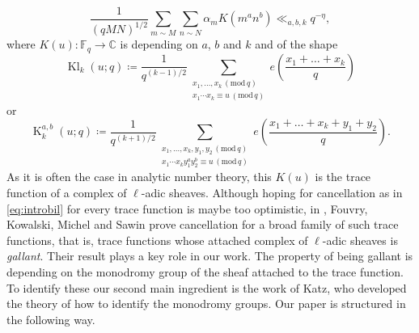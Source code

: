 \documentclass[12pt]{amsart}
\theoremstyle{plain}
\theoremstyle{definition}
\theoremstyle{remark}
\numberwithin{equation}{section}
\newcommand{\CC}{\mathbb{C}}
\newcommand{\FF}{\mathbb{F}}
\newcommand{\mods}[1]{\,(\mathrm{mod}\,{#1})}
\DeclareMathOperator{\Kl}{Kl}%
\DeclareMathOperator{\K}{K} %
\begin{document}
\begin{equation}\label{eq:introbil}
    \frac{1}{(qMN)^{1/2}}\sum_{m\sim M}\sum_{n\sim N}\alpha_m K(m^an^b) \ll_{a,b,k} q^{-\eta},
\end{equation}
where $K(u) \colon \FF_q \to \CC$ is depending on $a$, $b$ and $k$ and of the shape 
\begin{equation*}
\Kl_k( u;q) \coloneqq \frac{1}{q^{(k-1)/2}}\sum_{\substack{ x_1,\dots, x_k \mods q\\  x_1\cdots  x_k \equiv  u \mods q}}e\left(\frac{ x_1+\dots+ x_k}{q}\right) \end{equation*} or
\begin{equation*}
    \K_k^{a,b}( u;q) \coloneqq \frac{1}{q^{(k+1)/2}} \sum_{\substack{ x_1,\dots, x_k,y_1,y_2 \mods q\\ x_1\cdots  x_ky_1^a y_2^b \equiv  u \mods q}}e\left(\frac{ x_1+\dots +  x_k+y_1+y_2}{q}\right).  \end{equation*}
As it is often the case in analytic number theory, this $K(u)$ is the trace function of a complex of $\ell$-adic sheaves. Although hoping for cancellation as in \eqref{eq:introbil} for every trace function is maybe too optimistic, in \cite{FKMSbilinear}, Fouvry, Kowalski, Michel and Sawin prove cancellation for a broad family of such trace functions, that is, trace functions whose attached complex of $\ell$-adic sheaves is \emph{gallant}. Their result plays a key role in our work. The property of being gallant is depending on the monodromy group of the sheaf attached to the trace function. To identify these our second main ingredient is the work of Katz, \cite{Katzbook} who developed the theory of how to identify the monodromy groups. Our paper is structured in the following way. 
\end{document}
